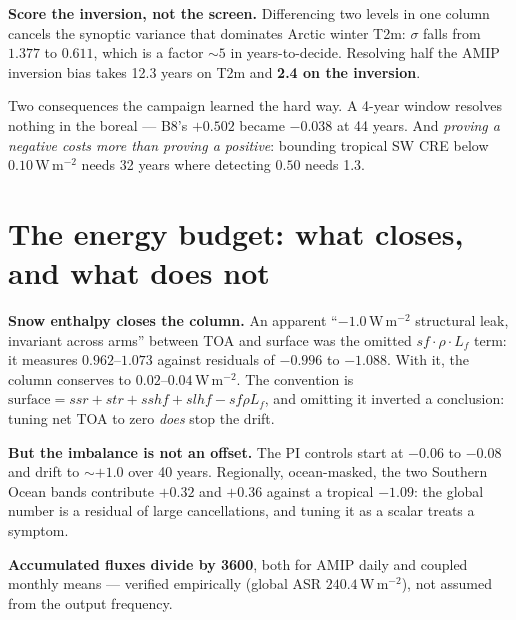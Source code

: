\documentclass[10pt]{article}
\begin{document}
\textbf{Score the inversion, not the screen.} Differencing two levels in one column
cancels the synoptic variance that dominates Arctic winter T2m: $\sigma$ falls from
$1.377$ to $0.611$, which is a factor ${\sim}5$ in years-to-decide. Resolving half the
AMIP inversion bias takes 12.3 years on T2m and \textbf{2.4 on the inversion}.

Two consequences the campaign learned the hard way. A 4-year window resolves nothing in
the boreal --- B8's $+0.502$ became $-0.038$ at 44 years. And \emph{proving a negative
costs more than proving a positive}: bounding tropical SW CRE below $0.10$\,W\,m$^{-2}$
needs 32 years where detecting $0.50$ needs 1.3.

\section{The energy budget: what closes, and what does not}\label{sec:energy}
\textbf{Snow enthalpy closes the column.} An apparent ``$-1.0$\,W\,m$^{-2}$ structural
leak, invariant across arms'' between TOA and surface was the omitted
$sf\cdot\rho\cdot L_f$ term: it measures $0.962$--$1.073$ against residuals of $-0.996$ to
$-1.088$. With it, the column conserves to $0.02$--$0.04$\,W\,m$^{-2}$. The convention is
$\text{surface}=ssr+str+sshf+slhf-sf\rho L_f$, and omitting it inverted a conclusion:
tuning net TOA to zero \emph{does} stop the drift.

\textbf{But the imbalance is not an offset.} The PI controls start at $-0.06$ to $-0.08$
and drift to ${\sim}+1.0$ over 40 years. Regionally, ocean-masked, the two Southern Ocean
bands contribute $+0.32$ and $+0.36$ against a tropical $-1.09$: the global number is a
residual of large cancellations, and tuning it as a scalar treats a symptom.

\textbf{Accumulated fluxes divide by 3600}, both for AMIP daily and coupled monthly means
--- verified empirically (global ASR $240.4$\,W\,m$^{-2}$), not assumed from the output
frequency.
\end{document}
